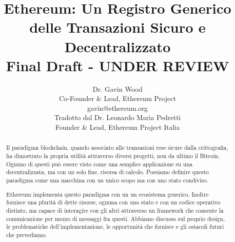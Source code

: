 \documentclass[9pt,oneside]{amsart}
\title{Ethereum: Un Registro Generico delle Transazioni Sicuro e Decentralizzato \\ {\smaller \textbf{Final Draft - UNDER REVIEW}}}
\author{
    Dr. Gavin Wood\\
    Co-Founder \& Lead, Ethereum Project\\
    gavin@ethereum.org\\
    Tradotto dal Dr. Leonardo Maria Pedretti\\
    Founder \& Lead, Ethereum Project Italia\\
}
\begin{document}
\pagecolor{lightyellow}

\begin{abstract}
Il paradigma blockchain, quando associato alle transazioni rese sicure dalla crittografia, ha dimostrato la propria utilità attraverso diversi progetti, non da ultimo il Bitcoin. Ognuno di questi può essere visto come una semplice applicazione su una decentralizzata, ma con un solo fine, risorsa di calcolo. Possiamo definire questo paradigma come una macchina con un unico scopo ma con uno stato condiviso.

Ethereum implementa questo paradigma con un un ecosistema generico. Inoltre fornisce una plurità di dette risorse, ognuna con uno stato e con un codice operativo distinto, ma capace di interagire con gli altri attraverso un framework che consente la comunicazione per mezzo di messaggi fra questi. Abbiamo discusso sul proprio design, le problematiche dell'implementazione, le opportunità che fornisce e gli ostacoli futuri che prevediamo.
\end{abstract}

\maketitle
\end{document}
